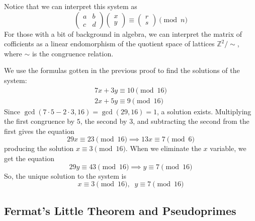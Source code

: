 \documentclass{article}
\newcounter{example}[section]
\begin{document}
Notice that we can interpret this system as
\begin{equation}
  \begin{pmatrix}
  a & b\\c&d
  \end{pmatrix} \begin{pmatrix}
  x \\ y
  \end{pmatrix} \equiv \begin{pmatrix}
  r \\ s
  \end{pmatrix} \pmod{n}
\end{equation}
For those with a bit of background in algebra, we can interpret the matrix of cofficients as a linear endomorphism of the quotient space of lattices $\mathbb{Z}^2 / \sim$, where $\sim$ is the congruence relation. 

\begin{example}
  \label{ex:solving-a-congruence-system-in-two-variables}
We use the formulas gotten in the previous proof to find the solutions of the system: 
\begin{align*}
    7x + 3y \equiv 10 \pmod{16} \\
    2x + 5y \equiv 9 \pmod{16} 
\end{align*}
Since $\gcd(7\cdot 5 - 2 \cdot 3, 16) = \gcd(29, 16) = 1$, a solution exists. Multiplying the first congruence by $5$, the second by $3$, and subtracting the second from the first gives the equation
\begin{equation}
  29 x \equiv 23 \pmod{16} \implies 13 x \equiv 7 \pmod{6}
\end{equation}
producing the solution $x \equiv 3 \pmod{16}$. When we eliminate the $x$ variable, we get the equation 
\begin{equation}
  29 y \equiv 43 \pmod{16} \implies y \equiv 7 \pmod{16}
\end{equation}
So, the unique solution to the system is
\begin{equation}
  x \equiv 3 \pmod{16}, \;\; y \equiv 7 \pmod{16}
\end{equation}
\end{example}

\subsection{Fermat's Little Theorem and Pseudoprimes}
\end{document}
